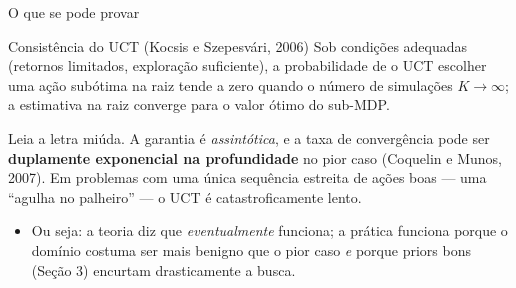 \documentclass[aspectratio=169, 11pt]{beamer}
\begin{document}
\begin{frame}{O que se pode provar}
  \begin{teobox}{Consistência do UCT (Kocsis e Szepesvári, 2006)}
    Sob condições adequadas (retornos limitados, exploração suficiente), a
    probabilidade de o UCT escolher uma ação subótima na raiz tende a zero
    quando o número de simulações $K \to \infty$; a estimativa na raiz converge
    para o valor ótimo do sub-MDP.
  \end{teobox}

  \pause
  \begin{alertabox}
    Leia a letra miúda. A garantia é \emph{assintótica}, e a taxa de convergência
    pode ser \textbf{duplamente exponencial na profundidade} no pior caso
    (Coquelin e Munos, 2007). Em problemas com uma única sequência estreita de
    ações boas --- uma ``agulha no palheiro'' --- o UCT é catastroficamente lento.
  \end{alertabox}

  \pause
  \begin{itemize}
    \item Ou seja: a teoria diz que \emph{eventualmente} funciona; a prática
          funciona porque o domínio costuma ser mais benigno que o pior caso
          \emph{e} porque priors bons (Seção 3) encurtam drasticamente a busca.
  \end{itemize}
\end{frame}
\end{document}
